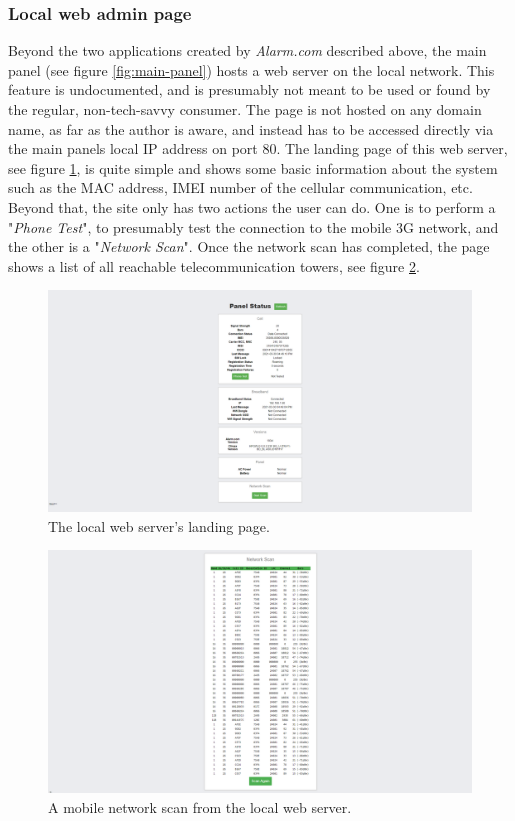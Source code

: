 \subsubsection{Local web admin page}
Beyond the two applications created by \textit{Alarm.com} described above, the main panel (see figure \ref{fig:main-panel}) hosts a web server on the local network. This feature is undocumented, and is presumably not meant to be used or found by the regular, non-tech-savvy consumer. The page is not hosted on any domain name, as far as the author is aware, and instead has to be accessed directly via the main panels local IP address on port 80. The landing page of this web server, see figure \ref{fig:local-landing-page}, is quite simple and shows some basic information about the system such as the MAC address, IMEI number of the cellular communication, etc. Beyond that, the site only has two actions the user can do. One is to perform a "\textit{Phone Test}", to presumably test the connection to the mobile 3G network, and the other is a "\textit{Network Scan}". Once the network scan has completed, the page shows a list of all reachable telecommunication towers, see figure \ref{fig:local-network-scan}.
\begin{figure}[!ht]
    \centering
    \includegraphics[width=\textwidth]{images/local-landing-page.png}
    \caption{The local web server's landing page.}
    \label{fig:local-landing-page}
\end{figure}
\begin{figure}[!ht]
    \centering
    \includegraphics[width=\textwidth]{images/local-network-scan.png}
    \caption{A mobile network scan from the local web server.}
    \label{fig:local-network-scan}
\end{figure}
